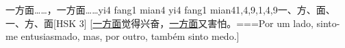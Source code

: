 \begin{EntryWithPhonetic}{一方面……，一方面……}{yi4 fang1 mian4 yi4 fang1 mian4}{1,4,9,1,4,9}{⼀、⽅、⾯、⼀、⽅、⾯}[HSK 3]
  [\underline{一方面}觉得兴奋，\underline{一方面}又害怕。===Por um lado, sinto-me entusiasmado, mas, por outro, também sinto medo.]
\end{EntryWithPhonetic}
